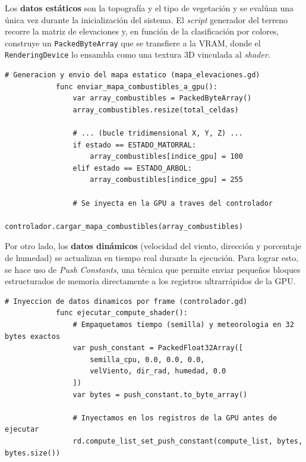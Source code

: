             Los \textbf{datos estáticos} son la topografía y el tipo de vegetación y se evalúan una única vez durante la inicialización del sistema. El \textit{script} generador del terreno recorre la matriz de elevaciones y, en función de la clasificación por colores, construye un \texttt{PackedByteArray} que se transfiere a la VRAM, donde el \texttt{RenderingDevice} lo ensambla como una textura 3D vinculada al \textit{shader}.\\
            
            \begin{lstlisting}[language=GodotShader]
            # Generacion y envio del mapa estatico (mapa_elevaciones.gd)
            func enviar_mapa_combustibles_a_gpu():
                var array_combustibles = PackedByteArray()
                array_combustibles.resize(total_celdas) 
                
                # ... (bucle tridimensional X, Y, Z) ...
                if estado == ESTADO_MATORRAL:
                    array_combustibles[indice_gpu] = 100
                elif estado == ESTADO_ARBOL:
                    array_combustibles[indice_gpu] = 255
                        
                # Se inyecta en la GPU a traves del controlador
                controlador.cargar_mapa_combustibles(array_combustibles)
            \end{lstlisting}

            Por otro lado, los \textbf{datos dinámicos} (velocidad del viento, dirección y porcentaje de humedad) se actualizan en tiempo real durante la ejecución. Para lograr esto, se hace uso de \textit{Push Constants}, una técnica que permite enviar pequeños bloques estructurados de memoria directamente a los registros ultrarrápidos de la GPU.
            
            \begin{lstlisting}[language=GodotShader]
            # Inyeccion de datos dinamicos por frame (controlador.gd)
            func ejecutar_compute_shader():
                # Empaquetamos tiempo (semilla) y meteorologia en 32 bytes exactos
                var push_constant = PackedFloat32Array([
                    semilla_cpu, 0.0, 0.0, 0.0, 
                    velViento, dir_rad, humedad, 0.0 
                ])
                var bytes = push_constant.to_byte_array()
                
                # Inyectamos en los registros de la GPU antes de ejecutar
                rd.compute_list_set_push_constant(compute_list, bytes, bytes.size())
            \end{lstlisting}

